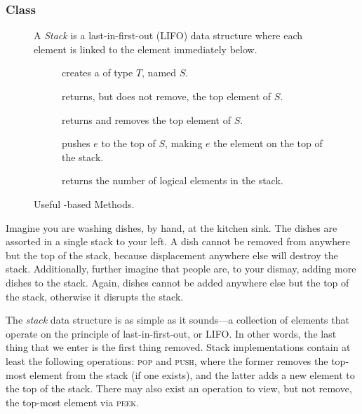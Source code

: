 \subsubsection*{ Class}
\begin{figure}[tp]
  \small
  \begin{tcolorbox}[title=Java Stacks]
    A \emph{Stack} is a last-in-first-out (LIFO) data structure where each element is linked to the element immediately below. 
    \vspace{2ex}
  \begin{description}
    \item [] creates a  of type $T$, named $S$.
    \item [] returns, but does not remove, the top element of $S$.
    \item [] returns and removes the top element of $S$.
    \item [] pushes $e$ to the top of $S$, making $e$ the element on the top of the stack.
    \item [] returns the number of logical elements in the stack.
  \end{description}
\end{tcolorbox}
  \caption{Useful -based Methods.}
  \label{fig:stacks}
\end{figure}

Imagine you are washing dishes, by hand, at the kitchen sink. 
The dishes are assorted in a single stack to your left. 
A dish cannot be removed from anywhere but the top of the stack, because displacement anywhere else will destroy the stack. 
Additionally, further imagine that people are, to your dismay, adding more dishes to the stack. 
Again, dishes cannot be added anywhere else but the top of the stack, otherwise it disrupts the stack.

The \emph{stack} data structure is as simple as it sounds---a collection of elements that operate on the principle of last-in-first-out, or LIFO. 
In other words, the last thing that we enter is the first thing removed. 
Stack implementations contain at least the following operations: \textsc{pop} and \textsc{push}, where the former removes the top-most element from the stack (if one exists), and the latter adds a new element to the top of the stack. 
There may also exist an operation to view, but not remove, the top-most element via \textsc{peek}. 

